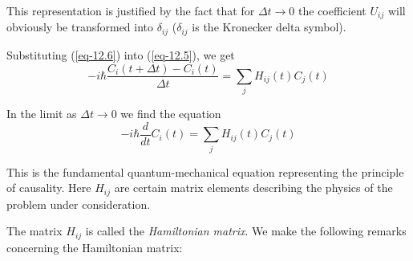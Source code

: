 \documentclass[a4paper,sfsidenotes,colorlinks=true]{tufte-book}
\numberwithin{equation}{section}
\numberwithin{figure}{section}
\begin{document}
This representation is justified by the fact that for $\Delta t \to 0$
the coefficient $U_{ij}$ will obviously be transformed into $\delta_{ij}$ ($\delta_{ij}$
is the Kronecker delta symbol). 

Substituting (\ref{eq-12.6}) into (\ref{eq-12.5}), we get
\begin{equation}%
-i \hbar \frac{C_{i} (t + \Delta t) - C_{i} (t)}{\Delta t} = \sum_{j} H_{ij}(t) C_{j} (t)
\label{eq-12.7} 
\end{equation}

In the limit as $\Delta t \to 0$ we find the equation 
\begin{equation}%
-i \hbar \frac{d}{dt} C_{i} (t)  = \sum_{j} H_{ij}(t) C_{j} (t)
\label{eq-12.8} 
\end{equation}

This is the fundamental quantum-mechanical equation representing the
principle of causality. Here $H_{ij}$ are certain matrix elements
describing the physics of the problem under consideration.  

The matrix  $H_{ij}$ is called the \emph{Hamiltonian matrix}. We make the following
remarks concerning the Hamiltonian matrix:
\end{document}
